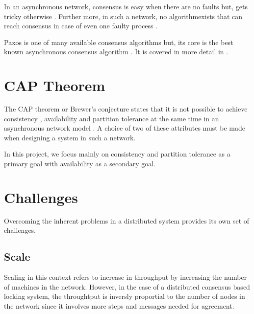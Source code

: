 In an asynchronous network, consensus is easy when there are no faults but, 
gets tricky otherwise \citep{Lampson:1996:HBH}. Further more, in such a network,
no algorithmexists that can reach consensus in case of even one faulty process
\citep{FisLynPat85}.

Paxos is one of many available consensus algorithms but, its core is the best
known asynchronous consensus algorithm \citep{Lampson:1996:HBH}. It is covered
in more detail in .

\section{CAP Theorem}

The CAP theorem or Brewer's conjecture states that it is not 
possible to achieve consistency%
, availability%
and partition tolerance%
at the same time in an asynchronous network model
\citep{journals/sigact/GilbertL02}. A choice of two of these attributes must
be made when designing a system in such a network.

In this project, we focus mainly on consistency and partition tolerance 
as a primary goal with availability as a secondary goal.

\section{Challenges}

Overcoming the inherent problems in a distributed system provides its own set of
challenges.

\subsection{Scale}

Scaling in this context refers to increase in throughput by increasing the
number of machines in the network. However, in the case of a distributed 
consensus based locking system, the throughtput is inversly proportial to the 
number of nodes in the network since it involves more steps and messages needed 
for agreement.

